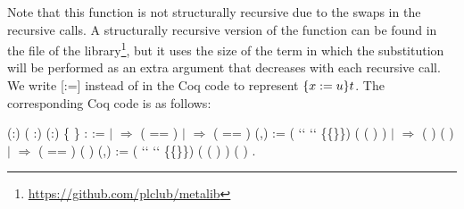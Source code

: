 Note that this function is not structurally recursive due to the swaps in the recursive calls. A structurally recursive version of the function  can be found in the file  of the  library\footnote{\url{https://github.com/plclub/metalib}}, but it uses the size of the term in which the substitution will be performed as an extra argument that decreases with each recursive call. We write [:=] instead of     in the Coq code to represent $\metasub{t}{x}{u}$. The corresponding Coq code is as follows: 
\begin{coqdoccode}
\coqdocemptyline
\coqdocnoindent
{}  (:) ( :) (:) \{  \} :  :=\coqdoceol
\coqdocindent{1.00em}
  \coqdoceol
\coqdocindent{1.00em}
\ensuremath{|}   \ensuremath{\Rightarrow}  ( == )    \coqdoceol
\coqdocindent{1.00em}
\ensuremath{|}    \ensuremath{\Rightarrow}  ( == )     (,\coqdocvar{\_}) :=\coqdoceol
\coqdocindent{2.00em}
 (  ``   `` \{\{\}\})    ( (   )  )\coqdoceol
\coqdocindent{1.00em}
\ensuremath{|}    \ensuremath{\Rightarrow}  (   ) (   )\coqdoceol
\coqdocindent{1.00em}
\ensuremath{|}     \ensuremath{\Rightarrow}  ( == )     (   )   (,\coqdocvar{\_}) :=\coqdoceol
\coqdocindent{2.00em}
 (  ``   `` \{\{\}\}) \coqdoceol
\coqdocindent{2.00em}
 ( (   )  )  (   ) \coqdoceol
\coqdocnoindent
{}.\coqdoceol
\coqdocemptyline
\end{coqdoccode}
